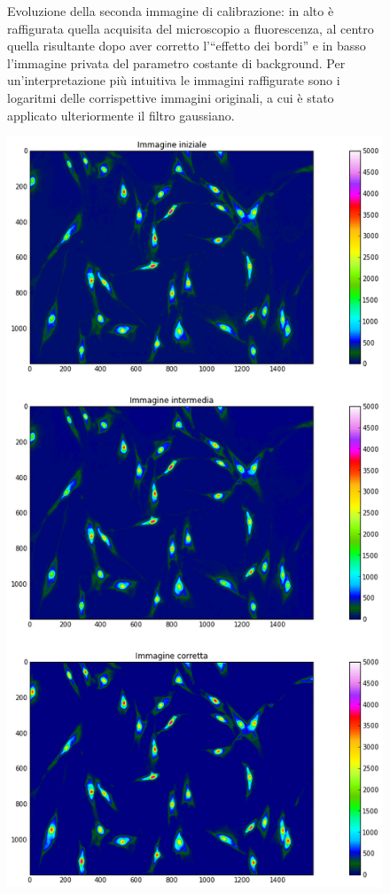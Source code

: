\begin{figure}
 \caption{\small{Evoluzione della seconda immagine di calibrazione: in alto è raffigurata quella acquisita del microscopio a fluorescenza, al centro quella risultante dopo aver corretto l'``effetto dei bordi'' e in basso l'immagine privata del parametro costante di background. Per un'interpretazione più intuitiva le immagini raffigurate sono i logaritmi delle corrispettive immagini originali, a cui è stato applicato ulteriormente il filtro gaussiano.}}
 \label{fig:lg3}
\end{figure}

\begin{figure}
 \centering
 \includegraphics[scale=.50]{img/CAP4cmap.png}

\end{figure}
